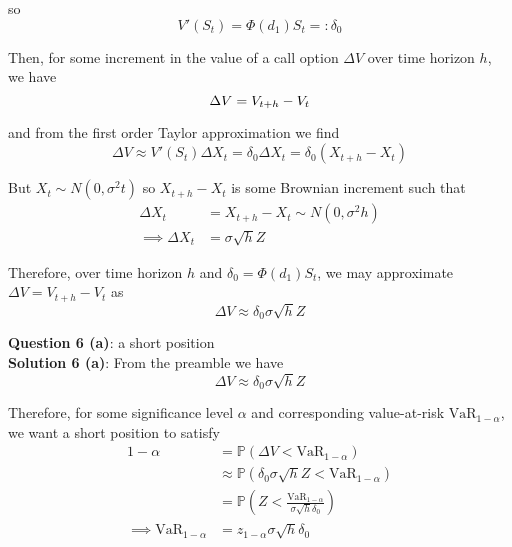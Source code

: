 \documentclass[12pt]{article}
\renewcommand{\P}{\mathbb P}
\begin{document}
so
\begin{equation*}
	V'(S_t) = \Phi(d_1) S_t =: \delta_0
\end{equation*}	
	
Then, for some increment in the value of a call option $\Delta V$ over time horizon $h$, we have
\begin{equation*}
	\Delta V = V_{t + h} - V_t \\
\end{equation*}

and from the first order Taylor approximation we find
\begin{equation*}
	\Delta V \approx V'(S_t) \Delta X_t = \delta_0 \Delta X_t = \delta_0 \left( X_{t + h} - X_t \right)
\end{equation*}

But $X_t \sim N \left(0, \sigma^2 t\right)$ so $X_{t + h} - X_t$ is some Brownian increment such that
\begin{align*}
	\Delta X_t &= X_{t + h} - X_t \sim N \left(0, \sigma^2 h\right) \\
	\implies \Delta X_t &= \sigma \sqrt{h} Z 
\end{align*}

Therefore, over time horizon $h$ and $\delta_0 = \Phi(d_1)S_t$, we may approximate $\Delta V = V_{t + h} - V_t$ as
\begin{equation*}
	\Delta V \approx \delta_0\sigma\sqrt{h}Z
\end{equation*}


{\bf Question 6 (a)}: a short position \\

{\bf Solution 6 (a)}: From the preamble we have
\begin{equation*}
	\Delta V \approx \delta_0\sigma\sqrt{h}Z
\end{equation*}

Therefore, for some significance level $\alpha$ and corresponding value-at-risk $\text{VaR}_{1 - \alpha}$, we want a short position to satisfy
\begin{align*}
	1 - \alpha &= \P \left( \Delta V < \text{VaR}_{1 - \alpha} \right) \\
	&\approx \P \left( \delta_0\sigma\sqrt{h}Z < \text{VaR}_{1 - \alpha} \right) \\
	&= \P \left( Z < \frac{ \text{VaR}_{1 - \alpha} }{ \sigma\sqrt{h}\delta_0 } \right) \\
	\implies \text{VaR}_{1 - \alpha} &= z_{1 - \alpha} \sigma \sqrt{h} \delta_0
\end{align*}
\end{document}
